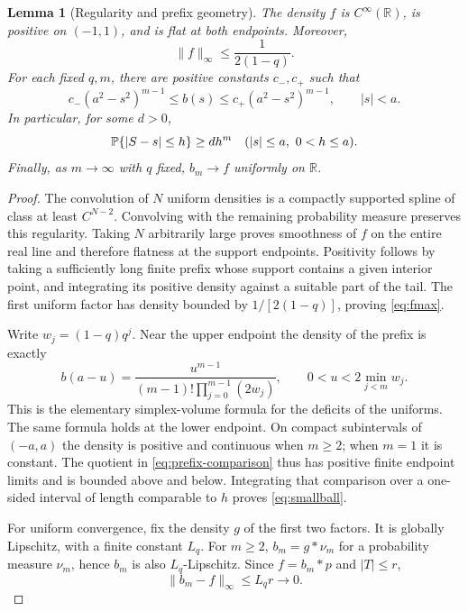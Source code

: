 \documentclass[11pt,a4paper]{article}
\numberwithin{equation}{section}
\newtheorem{lemma}[theorem]{Lemma}
\theoremstyle{definition}\newtheorem{definition}[theorem]{Definition}
\theoremstyle{remark}\newtheorem{remark}[theorem]{Remark}
\newcommand{\R}{\mathbb R}\newcommand{\C}{\mathbb C}
\newcommand{\norm}[1]{\lVert #1\rVert}
\begin{document}
\begin{lemma}[Regularity and prefix geometry]
\label{lem:regularity}
The density $f$ is $C^\infty(\R)$, is positive on $(-1,1)$, and is flat at both endpoints. Moreover,
\begin{equation}
 \norm{f}_\infty\le \frac1{2(1-q)}.
 \label{eq:fmax}
\end{equation}
For each fixed $q,m$, there are positive constants $c_-,c_+$ such that
\begin{equation}
 c_-(a^2-s^2)^{m-1}\le b(s)\le c_+(a^2-s^2)^{m-1},\qquad |s|<a.
 \label{eq:prefix-comparison}
\end{equation}
In particular, for some $d>0$,
\begin{equation}
 \mathbb P\{|S-s|\le h\}\ge d h^m
 \quad (|s|\le a,\ 0<h\le a).
 \label{eq:smallball}
\end{equation}
Finally, as $m\to\infty$ with $q$ fixed, $b_m\to f$ uniformly on $\R$.
\end{lemma}
\begin{proof}
The convolution of $N$ uniform densities is a compactly supported spline of class at least $C^{N-2}$. Convolving with the remaining probability measure preserves this regularity. Taking $N$ arbitrarily large proves smoothness of $f$ on the entire real line and therefore flatness at the support endpoints. Positivity follows by taking a sufficiently long finite prefix whose support contains a given interior point, and integrating its positive density against a suitable part of the tail. The first uniform factor has density bounded by $1/[2(1-q)]$, proving \eqref{eq:fmax}.

Write $w_j=(1-q)q^j$. Near the upper endpoint the density of the prefix is exactly
\begin{equation}
 b(a-u)=\frac{u^{m-1}}{(m-1)!\prod_{j=0}^{m-1}(2w_j)},
 \qquad 0<u<2\min_{j<m}w_j.
 \label{eq:prefix-edge}
\end{equation}
This is the elementary simplex-volume formula for the deficits of the uniforms. The same formula holds at the lower endpoint. On compact subintervals of $(-a,a)$ the density is positive and continuous when $m\ge2$; when $m=1$ it is constant. The quotient in \eqref{eq:prefix-comparison} thus has positive finite endpoint limits and is bounded above and below. Integrating that comparison over a one-sided interval of length comparable to $h$ proves \eqref{eq:smallball}.

For uniform convergence, fix the density $g$ of the first two factors. It is globally Lipschitz, with a finite constant $L_q$. For $m\ge2$, $b_m=g*\nu_m$ for a probability measure $\nu_m$, hence $b_m$ is also $L_q$-Lipschitz. Since $f=b_m*p$ and $|T|\le r$,
\[
 \norm{b_m-f}_\infty\le L_qr\longrightarrow0.
\]
\end{proof}
\end{document}
